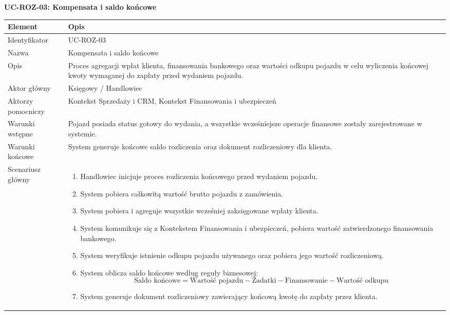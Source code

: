 \textbf{UC-ROZ-03: Kompensata i saldo końcowe}

\begin{longtable}{|p{4cm}|p{11cm}|}
\hline
\textbf{Element} & \textbf{Opis} \\
\hline

Identyfikator & UC-ROZ-03 \\
\hline

Nazwa & Kompensata i saldo końcowe \\
\hline

Opis &
Proces agregacji wpłat klienta, finansowania bankowego oraz wartości odkupu pojazdu w celu wyliczenia końcowej kwoty wymaganej do zapłaty przed wydaniem pojazdu. \\
\hline

Aktor główny & Księgowy / Handlowiec \\
\hline

Aktorzy pomocniczy & Kontekst Sprzedaży i CRM, Kontekst Finansowania i ubezpieczeń \\
\hline

Warunki wstępne &
Pojazd posiada status gotowy do wydania, a wszystkie wcześniejsze operacje finansowe zostały zarejestrowane w systemie. \\
\hline

Warunki końcowe &
System generuje końcowe saldo rozliczenia oraz dokument rozliczeniowy dla klienta. \\
\hline

Scenariusz główny &
\begin{enumerate}
\item Handlowiec inicjuje proces rozliczenia końcowego przed wydaniem pojazdu.
\item System pobiera całkowitą wartość brutto pojazdu z zamówienia.
\item System pobiera i agreguje wszystkie wcześniej zaksięgowane wpłaty klienta.
\item System komunikuje się z Kontekstem Finansowania i ubezpieczeń, pobiera wartość zatwierdzonego finansowania bankowego.
\item System weryfikuje istnienie odkupu pojazdu używanego oraz pobiera jego wartość rozliczeniową.
\item System oblicza saldo końcowe według reguły biznesowej:
\[
\text{Saldo końcowe} =
\text{Wartość pojazdu}
- \text{Zadatki}
- \text{Finansowanie}
- \text{Wartość odkupu}
\]
\item System generuje dokument rozliczeniowy zawierający końcową kwotę do zapłaty przez klienta.
\end{enumerate}
\\
\hline


\end{longtable}
